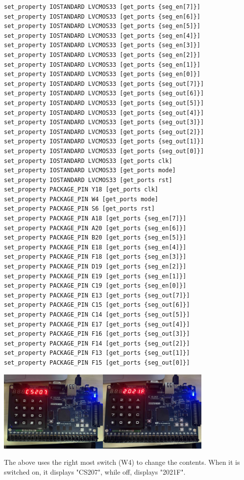 \documentclass[onecolumn, oneside, ctexart]{SUSTechHomework}
\begin{document}
\begin{lstlisting}[caption={Constraint File}]
set_property IOSTANDARD LVCMOS33 [get_ports {seg_en[7]}]
set_property IOSTANDARD LVCMOS33 [get_ports {seg_en[6]}]
set_property IOSTANDARD LVCMOS33 [get_ports {seg_en[5]}]
set_property IOSTANDARD LVCMOS33 [get_ports {seg_en[4]}]
set_property IOSTANDARD LVCMOS33 [get_ports {seg_en[3]}]
set_property IOSTANDARD LVCMOS33 [get_ports {seg_en[2]}]
set_property IOSTANDARD LVCMOS33 [get_ports {seg_en[1]}]
set_property IOSTANDARD LVCMOS33 [get_ports {seg_en[0]}]
set_property IOSTANDARD LVCMOS33 [get_ports {seg_out[7]}]
set_property IOSTANDARD LVCMOS33 [get_ports {seg_out[6]}]
set_property IOSTANDARD LVCMOS33 [get_ports {seg_out[5]}]
set_property IOSTANDARD LVCMOS33 [get_ports {seg_out[4]}]
set_property IOSTANDARD LVCMOS33 [get_ports {seg_out[3]}]
set_property IOSTANDARD LVCMOS33 [get_ports {seg_out[2]}]
set_property IOSTANDARD LVCMOS33 [get_ports {seg_out[1]}]
set_property IOSTANDARD LVCMOS33 [get_ports {seg_out[0]}]
set_property IOSTANDARD LVCMOS33 [get_ports clk]
set_property IOSTANDARD LVCMOS33 [get_ports mode]
set_property IOSTANDARD LVCMOS33 [get_ports rst]
set_property PACKAGE_PIN Y18 [get_ports clk]
set_property PACKAGE_PIN W4 [get_ports mode]
set_property PACKAGE_PIN S6 [get_ports rst]
set_property PACKAGE_PIN A18 [get_ports {seg_en[7]}]
set_property PACKAGE_PIN A20 [get_ports {seg_en[6]}]
set_property PACKAGE_PIN B20 [get_ports {seg_en[5]}]
set_property PACKAGE_PIN E18 [get_ports {seg_en[4]}]
set_property PACKAGE_PIN F18 [get_ports {seg_en[3]}]
set_property PACKAGE_PIN D19 [get_ports {seg_en[2]}]
set_property PACKAGE_PIN E19 [get_ports {seg_en[1]}]
set_property PACKAGE_PIN C19 [get_ports {seg_en[0]}]
set_property PACKAGE_PIN E13 [get_ports {seg_out[7]}]
set_property PACKAGE_PIN C15 [get_ports {seg_out[6]}]
set_property PACKAGE_PIN C14 [get_ports {seg_out[5]}]
set_property PACKAGE_PIN E17 [get_ports {seg_out[4]}]
set_property PACKAGE_PIN F16 [get_ports {seg_out[3]}]
set_property PACKAGE_PIN F14 [get_ports {seg_out[2]}]
set_property PACKAGE_PIN F13 [get_ports {seg_out[1]}]
set_property PACKAGE_PIN F15 [get_ports {seg_out[0]}]
\end{lstlisting}

\centerline{\includegraphics[width=0.4\textwidth]{fig/cs}\quad \includegraphics[width=0.4\textwidth]{fig/21f}}

\par The above uses the right most switch (W4) to change the contents. When it is switched on, it displays "CS207", while off, displays "2021F".
\end{document}
